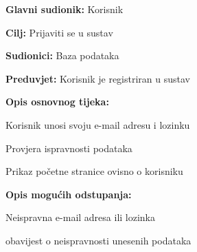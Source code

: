 					\noindent {}
					\begin{packed_item}
	
						\item \textbf{Glavni sudionik: }Korisnik
						\item  \textbf{Cilj: } Prijaviti se u sustav
						\item  \textbf{Sudionici: } Baza podataka
						\item  \textbf{Preduvjet: } Korisnik je registriran u sustav
						\item  \textbf{Opis osnovnog tijeka: }
						
						\item[] \begin{packed_enum}
	
							\item Korisnik unosi svoju e-mail adresu i lozinku
							\item Provjera ispravnosti podataka
							\item Prikaz početne stranice ovisno o korisniku
						\end{packed_enum}
						
						\item  \textbf{Opis mogućih odstupanja:}
						
						\item[] \begin{packed_item}
	
							\item[2.a] Neispravna e-mail adresa ili lozinka
							\item[] \begin{packed_enum}
								
								\item obavijest o neispravnosti unesenih podataka
								
							\end{packed_enum}
							
						\end{packed_item}
					\end{packed_item}
				
